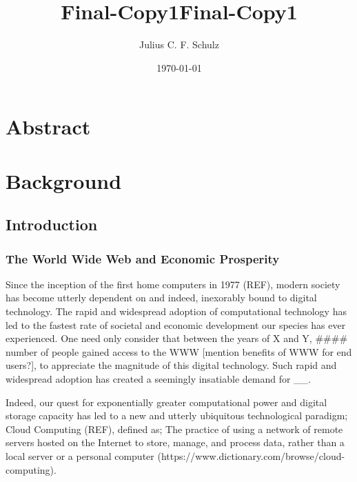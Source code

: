 \documentclass[reprint, floatfix, groupaddress, prb]{revtex4-1}
\title{Final-Copy1}
\begin{document}
    
    
    \author{Julius C. F. Schulz}\title{Final-Copy1}

\date{\today}
\maketitle

    
    

    



    \hypertarget{abstract}{%
\section{Abstract}\label{abstract}}

    

    \hypertarget{background}{%
\section{Background}\label{background}}

    \hypertarget{introduction}{%
\subsection{Introduction}\label{introduction}}

    \hypertarget{the-world-wide-web-and-economic-prosperity}{%
\subsubsection{The World Wide Web and Economic
Prosperity}\label{the-world-wide-web-and-economic-prosperity}}

    Since the inception of the first home computers in 1977
(REF)\cite{7169703/23A77C9T}, modern society has become utterly
dependent on and indeed, inexorably bound to digital technology. The
rapid and widespread adoption of computational technology has led to the
fastest rate of societal and economic development our species has ever
experienced. One need only consider that between the years of X and Y,
\#\#\#\# number of people gained access to the WWW {[}mention benefits
of WWW for end users?{]}, to appreciate the magnitude of this digital
technology. Such rapid and widespread adoption has created a seemingly
insatiable demand for \_\_.

Indeed, our quest for exponentially greater computational power and
digital storage capacity has led to a new and utterly ubiquitous
technological paradigm; Cloud Computing (REF), defined as; The practice
of using a network of remote servers hosted on the Internet to store,
manage, and process data, rather than a local server or a personal
computer (https://www.dictionary.com/browse/cloud-computing).
\end{document}
